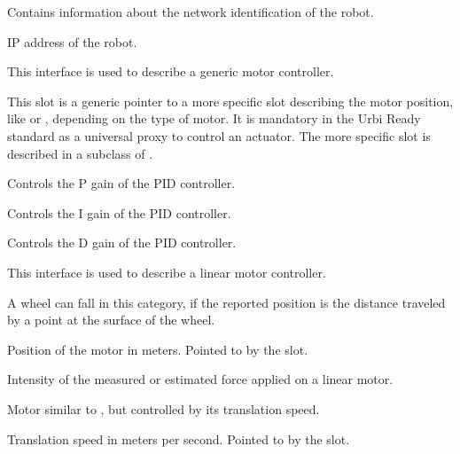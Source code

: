 
Contains information about the network identification of the robot.

\begin{slots}
  {%
    IP address of the robot.%
  }

\end{slots}


This interface is used to describe a generic motor controller.

\begin{slots}
  {%
    This slot is a generic pointer to a more specific slot describing
    the motor position, like  or ,
    depending on the type of motor. It is mandatory in the Urbi Ready
    standard as a universal proxy to control an actuator. The more
    specific slot is described in a subclass of .%
  }

  {%
    Controls the P gain of the PID controller.%
  }

  {%
    Controls the I gain of the PID controller.%
  }

  {%
    Controls the D gain of the PID controller.%
  }

\end{slots}



This interface is used to describe a linear motor controller.

A wheel can fall in this category, if the reported position is the distance
traveled by a point at the surface of the wheel.

\begin{slots}
  {%
    Position of the motor in meters.  Pointed to by the
     slot.%
  }

  {%
    Intensity of the measured or estimated force applied on a linear
    motor.%
  }

\end{slots}


Motor similar to , but controlled by its translation speed.

\begin{slots}
  {%
    Translation speed in meters per second. Pointed to by the  slot.%
  }
\end{slots}


